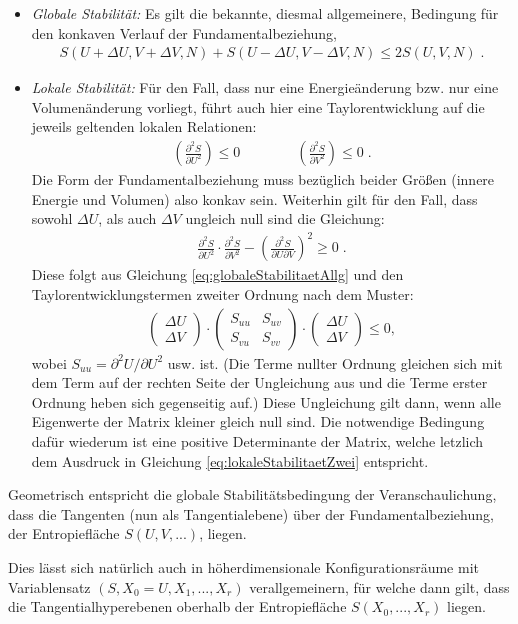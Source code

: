 \begin{itemize}
	\item \emph{Globale Stabilität:} Es gilt die bekannte, diesmal allgemeinere, Bedingung für den konkaven Verlauf der Fundamentalbeziehung,
	\begin{align}
		\label{eq:globaleStabilitaetAllg}
		\boxed{S(U+\Delta U, V+\Delta V,N)+S(U-\Delta U, V-\Delta V,N)\leq2S(U,V,N)}\;.
	\end{align}
	\item \emph{Lokale Stabilität:} Für den Fall, dass nur eine Energieänderung bzw. nur eine Volumenänderung vorliegt, führt auch hier eine Taylorentwicklung auf die jeweils geltenden lokalen Relationen:
	\begin{align*}
		\boxed{\left(\frac{\partial^2S}{\partial U^2}\right)\leq 0}\qquad\qquad \boxed{\left(\frac{\partial^2S}{\partial V^2}\right)\leq 0}\;.
	\end{align*}
	Die Form der Fundamentalbeziehung muss bezüglich beider Größen (innere Energie und Volumen) also konkav sein.
	Weiterhin gilt für den Fall, dass sowohl $\Delta U$, als auch $\Delta V$ ungleich null sind die Gleichung:
	\begin{align}
		\label{eq:lokaleStabilitaetZwei}
		\boxed{\frac{\partial ^2S}{\partial U^2}\cdot\frac{\partial ^2S}{\partial V^2}-\left(\frac{\partial ^2S}{\partial U\partial V}\right)^2\geq 0}\;.
	\end{align}
	Diese folgt aus Gleichung \ref{eq:globaleStabilitaetAllg} und den Taylorentwicklungstermen zweiter Ordnung nach dem Muster:
	\begin{align*}
		\begin{pmatrix}\Delta U\\\Delta V\end{pmatrix}\cdot\begin{pmatrix}S_{uu}&S_{uv}\\S_{vu}&S_{vv}\end{pmatrix}\cdot\begin{pmatrix}\Delta U\\\Delta V\end{pmatrix}\leq 0,
	\end{align*}
	wobei $S_{uu}=\partial^2U/\partial U^2$ usw. ist. (Die Terme nullter Ordnung gleichen sich mit dem Term auf der rechten Seite der Ungleichung aus und die Terme erster Ordnung heben sich gegenseitig auf.)
	Diese Ungleichung gilt dann, wenn alle Eigenwerte der Matrix kleiner gleich null sind. Die notwendige Bedingung dafür wiederum ist eine positive Determinante der Matrix, welche letzlich dem Ausdruck in Gleichung \ref{eq:lokaleStabilitaetZwei} entspricht.
\end{itemize}
\begin{formal}
	Geometrisch entspricht die globale Stabilitätsbedingung der Veranschaulichung, dass die Tangenten (nun als Tangentialebene) über der Fundamentalbeziehung, der Entropiefläche $S(U,V,...)$, liegen. 
\end{formal}
Dies lässt sich natürlich auch in höherdimensionale Konfigurationsräume mit Variablensatz $(S,X_0=U,X_1,...,X_r)$ verallgemeinern, für welche dann gilt, dass die Tangentialhyperebenen oberhalb der Entropiefläche $S(X_0,...,X_r)$ liegen.

